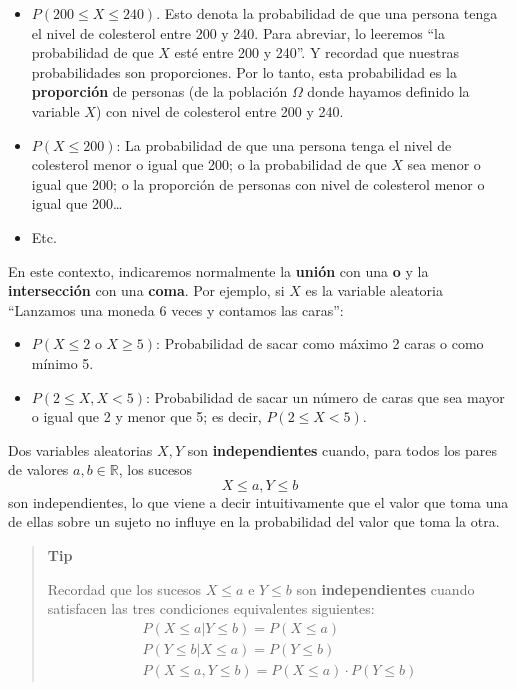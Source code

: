 \documentclass[
  spanish,
  letterpaper,
  DIV=11,
  numbers=noendperiod]{scrreprt}
\begin{document}
\begin{tcolorbox}
\begin{itemize}
\item
  \(P(200\leqslant X\leqslant 240)\). Esto denota la probabilidad de que
  una persona tenga el nivel de colesterol entre 200 y 240. Para
  abreviar, lo leeremos ``la probabilidad de que \(X\) esté entre 200 y
  240''. Y recordad que nuestras probabilidades son proporciones. Por lo
  tanto, esta probabilidad es la \textbf{proporción} de personas (de la
  población \(\Omega\) donde hayamos definido la variable \(X\)) con
  nivel de colesterol entre 200 y 240.
\item
  \(P(X\leqslant 200)\): La probabilidad de que una persona tenga el
  nivel de colesterol menor o igual que 200; o la probabilidad de que
  \(X\) sea menor o igual que 200; o la proporción de personas con nivel
  de colesterol menor o igual que 200\ldots{}
\item
  Etc.
\end{itemize}

En este contexto, indicaremos normalmente la \textbf{unión} con una
\textbf{o} y la \textbf{intersección} con una \textbf{coma}. Por
ejemplo, si \(X\) es la variable aleatoria ``Lanzamos una moneda 6 veces
y contamos las caras'':

\begin{itemize}
\item
  \(P(X\leqslant 2\text{ o }X\geqslant 5)\): Probabilidad de sacar como
  máximo 2 caras o como mínimo 5.
\item
  \(P(2\leqslant X, X< 5)\): Probabilidad de sacar un número de caras
  que sea mayor o igual que 2 y menor que 5; es decir,
  \(P(2\leqslant X< 5)\).
\end{itemize}

Dos variables aleatorias \(X,Y\) son \textbf{independientes} cuando,
para todos los pares de valores \(a,b\in \mathbb{R}\), los sucesos \[
X\leqslant a, Y\leqslant b
\] son independientes, lo que viene a decir intuitivamente que el valor
que toma una de ellas sobre un sujeto no influye en la probabilidad del
valor que toma la otra.

\begin{quote}
\textbf{Tip}

Recordad que los sucesos \(X\leqslant a\) e \(Y\leqslant b\) son
\textbf{independientes} cuando satisfacen las tres condiciones
equivalentes siguientes: \[
\begin{array}{l}
P(X\leqslant a|Y\leqslant b)=P(X\leqslant a)\\
P(Y\leqslant b|X\leqslant a)=P(Y\leqslant b)\\
P(X\leqslant a, Y\leqslant b)=P(X\leqslant a)\cdot P(Y\leqslant b)
\end{array}
\]
\end{quote}


\end{tcolorbox}
\end{document}
